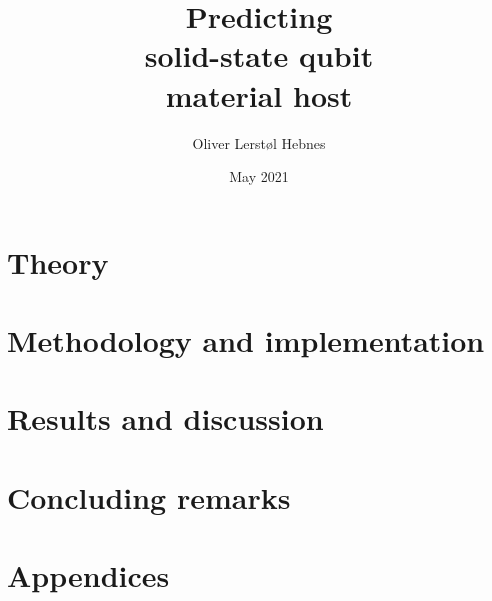 \documentclass[twoside, english, notitlepage, 12pt]{uiofysmaster}
\author{Oliver Lerstøl Hebnes}
\title{Predicting\\
solid-state qubit\\
material host
}
\date{May 2021}
\begin{document}
\hypersetup{pageanchor=false}
\frontmatter

    \maketitle

    \begin{abstract}
      
    \end{abstract}

    \begin{dedication}
      
    \end{dedication}

    \begin{acknowledgements}
      
    \end{acknowledgements}

    \setcounter{tocdepth}{2}
    \tableofcontents

\mainmatter

      

    \part{Theory}
        
        
        

    \part{Methodology and implementation}

        

    \part{Results and discussion}

      
      
      

    \part{Concluding remarks}
      

    \part{Appendices}
    \appendix
        

    \printbibliography%
\end{document}
